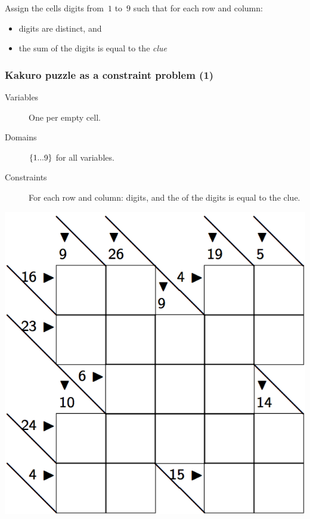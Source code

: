 \documentclass{beamer}
\newcommand{\stressed}[1]{\emph{{\color{red!50}{#1}}}}
\begin{document}
\begin{frame}
  \bigskip

  Assign the cells digits from~$1$ to~$9$ such that for each row and column:
  \begin{itemize}
    \item digits are distinct, and
    \item the sum of the digits is equal to the \emph{clue}
    \end{itemize}

\end{frame}

\begin{frame}
  \frametitle{Kakuro puzzle as a constraint problem (1)}
  \begin{minipage}{0.5\textwidth}
    \begin{description}
      \item[Variables] One per empty cell.
      \item[Domains] $\left\{1...9\right\}$ for all variables.
      \item[Constraints] For each row and column: \stressed{distinct} digits,
        and the \stressed{sum} of the digits is equal to the clue.
    \end{description} 
  \end{minipage}
  \begin{minipage}{0.45\textwidth}
    \includegraphics[scale=0.2]{kakuro.png}
  \end{minipage}
\end{frame}
\end{document}
